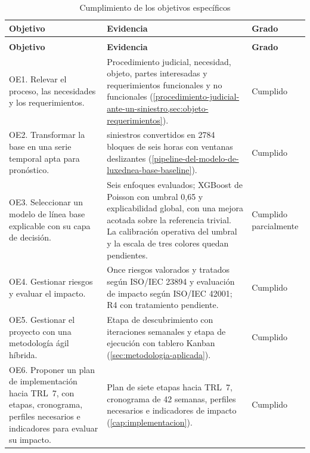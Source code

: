 {\small
\begin{longtable}{@{}>{\raggedright\arraybackslash}p{}
                    >{\raggedright\arraybackslash}p{}
                    >{\raggedright\arraybackslash}p{}@{}}
\caption{Cumplimiento de los objetivos específicos}
\label{tab:cumplimiento-objetivos} \\
\toprule
\textbf{Objetivo} & \textbf{Evidencia} & \textbf{Grado} \\
\midrule
\endfirsthead
\multicolumn{3}{@{}l}{\footnotesize\textit{Tabla \ref{tab:cumplimiento-objetivos} (continuación)}} \\
\toprule
\textbf{Objetivo} & \textbf{Evidencia} & \textbf{Grado} \\
\midrule
\endhead
\bottomrule
\endfoot
OE1. Relevar el proceso, las necesidades y los requerimientos. & Procedimiento judicial, necesidad, objeto, partes interesadas y requerimientos funcionales y no funcionales (\cref{procedimiento-judicial-ante-un-siniestro,sec:objeto-requerimientos}). & Cumplido \\
OE2. Transformar la base en una serie temporal apta para pronóstico. & 4320 siniestros convertidos en 2784 bloques de seis horas con ventanas deslizantes (\cref{pipeline-del-modelo-de-luxednea-base-baseline}). & Cumplido \\
OE3. Seleccionar un modelo de línea base explicable con su capa de decisión. & Seis enfoques evaluados; XGBoost de Poisson con umbral 0,65 y explicabilidad global, con una mejora acotada sobre la referencia trivial. La calibración operativa del umbral y la escala de tres colores quedan pendientes. & Cumplido parcialmente \\
OE4. Gestionar riesgos y evaluar el impacto. & Once riesgos valorados y tratados según ISO/IEC 23894 y evaluación de impacto según ISO/IEC 42001; R4 con tratamiento pendiente. & Cumplido \\
OE5. Gestionar el proyecto con una metodología ágil híbrida. & Etapa de descubrimiento con iteraciones semanales y etapa de ejecución con tablero Kanban (\cref{sec:metodologia-aplicada}). & Cumplido \\
OE6. Proponer un plan de implementación hacia TRL~7, con etapas, cronograma, perfiles necesarios e indicadores para evaluar su impacto. & Plan de siete etapas hacia TRL~7, cronograma de 42 semanas, perfiles necesarios e indicadores de impacto (\cref{cap:implementacion}). & Cumplido \\
\end{longtable}
}

